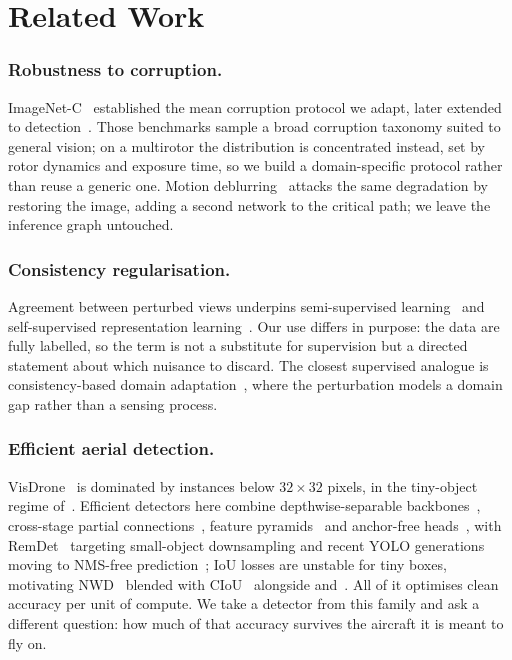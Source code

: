 \section{Related Work}
\label{sec:related}

\subsubsection{Robustness to corruption.}
ImageNet-C~\cite{hendrycks2019benchmarking} established the mean corruption
protocol we adapt, later extended to detection~\cite{michaelis2019benchmarking}.
Those benchmarks sample a broad corruption taxonomy suited to general vision; on a
multirotor the distribution is concentrated instead, set by rotor dynamics and
exposure time, so we build a domain-specific protocol rather than reuse a generic
one. Motion deblurring~\cite{nah2017deepdeblur} attacks the same degradation by
restoring the image, adding a second network to the critical path; we leave the
inference graph untouched.

\subsubsection{Consistency regularisation.}
Agreement between perturbed views underpins semi-supervised
learning~\cite{sajjadi2016regularization,tarvainen2017mean,sohn2020fixmatch} and
self-supervised representation learning~\cite{chen2020simclr,grill2020byol}. Our
use differs in purpose: the data are fully labelled, so the term is not a substitute
for supervision but a directed statement about which nuisance to discard. The
closest supervised analogue is consistency-based domain
adaptation~\cite{french2018selfensembling}, where the perturbation models a domain
gap rather than a sensing process.

\subsubsection{Efficient aerial detection.}
VisDrone~\cite{zhu2021visdrone} is dominated by instances below $32\times32$ pixels,
in the tiny-object regime of~\cite{yu2020tinyperson,cheng2023sod}. Efficient
detectors here combine depthwise-separable
backbones~\cite{qin2024mnv4,sandler2018mobilenetv2}, cross-stage partial
connections~\cite{wang2020cspnet}, feature pyramids~\cite{tan2020efficientdet} and
anchor-free heads~\cite{ge2021yolox}, with RemDet~\cite{chen2025remdet} targeting
small-object downsampling and recent YOLO generations moving to NMS-free
prediction~\cite{wang2024yolov10}; IoU losses are unstable for tiny boxes,
motivating NWD~\cite{wang2021nwd} blended with CIoU~\cite{zheng2020diou} alongside
\cite{li2020gfl} and~\cite{feng2021tood}. All of it optimises clean accuracy per
unit of compute. We take a detector from this family and ask a different question:
how much of that accuracy survives the aircraft it is meant to fly on.
